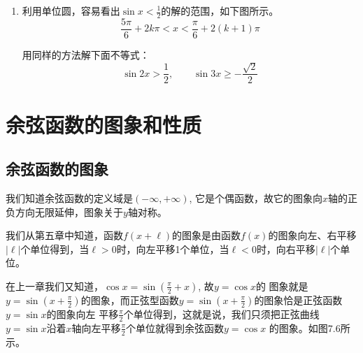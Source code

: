 \begin{enumerate}
\item 利用单位圆，容易看出$\sin x<\frac{1}{2}$的解的范围，如下图所示。
\[\frac{5\pi}{6}+2k\pi<x<\frac{\pi}{6}+2(k+1)\pi\]
\begin{center}
\end{center}


用同样的方法解下面不等式：
\[\sin 2x>\frac{1}{2},\qquad \sin 3x\ge -\frac{\sqrt{2}}{2}\]
\end{enumerate}  

\section{余弦函数的图象和性质}
\subsection{余弦函数的图象}

我们知道余弦函数的定义域是$(-\infty,+\infty)$, 它是个偶函数，故它的图象向$x$轴的正负方向无限延伸，图象关于$y$轴对称。

我们从第五章中知道，函数$f(x+\ell)$的图象是由函数$f(x)$的图象向左、右平移$|\ell|$个单位得到，当$\ell>0$时，向左平移1个单位，当$\ell<0$时，向右平移$|\ell|$个单位。

在上一章我们又知道，$\cos x=\sin\left(\frac{\pi}{2}+x\right)$,
故$y=\cos x$的
图象就是$y=\sin\left(x+\frac{\pi}{2}\right)$的图象，而正弦型函数$y=\sin\left(x+\frac{\pi}{2}\right)$的图象恰是正弦函数$y=\sin x$的图象向左
平移$\frac{\pi}{2}$个单位得到，这就是说，我们只须把正弦曲线
$y=\sin x$沿着$x$轴向左平移$\frac{\pi}{2}$个单位就得到余弦函数$y=\cos x$
的图象。如图7.6所示。

